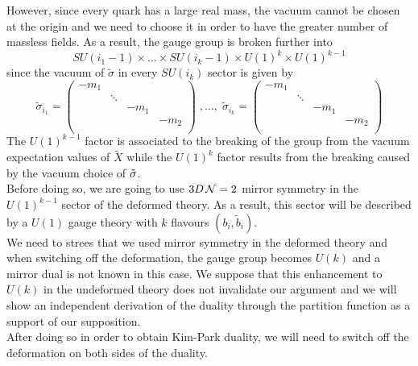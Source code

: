 However, since every quark has a large real mass, the vacuum cannot be chosen at the origin and we need to choose it in order to have the greater number of massless fields.
As a result, the gauge group is broken further into
\begin{equation}
SU(i_1 -1 ) \times \dots \times SU(i_k -1 ) \times U(1)^{k} \times U(1)^{k-1}
\end{equation}
since the vacuum of $\tilde{\sigma}$ in every $SU(i_k)$ sector is given by  
\begin{equation}
\tilde{\sigma}_{i_1} = 
\begin{pmatrix}
 - m_1 & \\
  & \ddots  \\
  & & - m_1 & \\
  & & & - m_2 \\
\end{pmatrix}
 \; ,
 \dotsc 
,
\;
\tilde{\sigma}_{i_k} = 
\begin{pmatrix}
 - m_1 & \\
  & \ddots  \\
  & & - m_1 & \\
  & & & - m_2 \\
\end{pmatrix}
\end{equation}
The $U(1)^{k-1}$ factor is associated to the breaking of the group from the vacuum expectation values of $\tilde{X}$ while the $U(1)^k$ factor results from the breaking caused by the vacuum choice of $\tilde{ \sigma}$.\\
Before doing so, we are going to use $3D \, \mathcal{N}=2$ mirror symmetry \cite{Aharony:1997bx} in the $U(1)^{k-1}$ sector of the deformed theory.
As a result, this sector will be described by a $ U(1)$  gauge theory with $k$ flavours $(b_i, \tilde{b}_i)$.\\
We need to strees that we used mirror symmetry in the deformed theory and when switching off the deformation, the gauge group becomes $U(k)$ and a mirror dual is not known in this case.
We suppose that this enhancement to $U(k)$ in the undeformed theory does not invalidate our argument and we will show an independent derivation of the duality through the partition function as a support of our supposition.
\\
After doing so in order to obtain Kim-Park duality, we will need to switch off the deformation on both sides of the duality.\\
